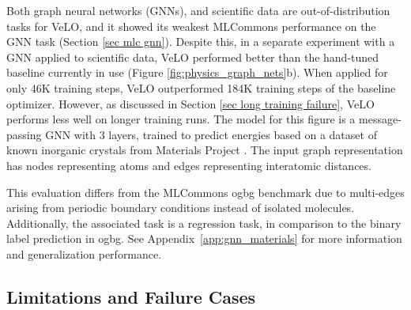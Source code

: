 \documentclass[11pt]{article}
\begin{document}




Both graph neural networks (GNNs), and scientific data are out-of-distribution tasks for VeLO, and it showed its weakest MLCommons performance on the GNN task (Section \ref{sec mlc gnn}).
Despite this, in a separate experiment with a GNN applied to scientific data, VeLO performed better than the hand-tuned baseline currently in use (Figure \ref{fig:physics_graph_nets}b). When applied for only 46K training steps, VeLO outperformed 184K training steps of the baseline optimizer.
However, as discussed in Section \ref{sec long training failure}, VeLO performs less well on longer training runs.
The model for this figure is a message-passing GNN \citep{gilmer2017neural} with 3 layers, trained to predict energies based on a dataset of known inorganic crystals from Materials Project \citep{jain2013commentary}. The input graph representation has nodes representing atoms and edges representing interatomic distances.

This evaluation differs from the MLCommons ogbg \citep{hu2020open} benchmark due to multi-edges arising from periodic boundary conditions instead of isolated molecules. Additionally, the associated task is a regression task, in comparison to the binary label prediction in ogbg. See Appendix~\ref{app:gnn_materials} for more information and generalization performance.



\subsection{Limitations and Failure Cases} \label{subsec:limitations}
\end{document}
